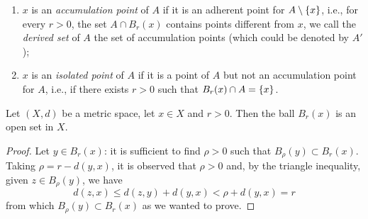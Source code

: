 \begin{definition}
\begin{enumerate}
\item
$x$ is an \emph{accumulation point}%
%
 of $A$ if
it is an adherent point for $A \setminus {\left\{ x \right\}}$, i.e.,
for every $r>0$, the set $A \cap B_r(x)$ contains points different from $x$, we
call the \emph{derived set}%
 of $A$ the set of accumulation points (which could be denoted by $A'$);
\item
$x$ is an \emph{isolated point}%
 of $A$ if it is a point of $A$ but not an accumulation point for $A$, i.e., if there exists $r>0$ such that
$B_r(x) \cap A = {\left\{ x \right\}}$.
\end{enumerate}
\end{definition}

\begin{theorem}
Let $(X,d)$ be a metric space, let $x\in X$ and $r>0$. Then the ball $B_r(x)$ is
an open set in $X$.
\end{theorem}
%
\begin{proof}
Let $y\in B_r(x)$: it is sufficient to find $\rho>0$ such that $B_\rho(y)
\subset B_r(x)$. Taking $\rho = r-d(y,x)$, it is observed that $\rho >0 $ and,
by the triangle inequality,
given $z \in B_\rho(y)$, we have
\[
  d(z,x) \le d(z,y) + d(y,x) < \rho + d(y,x) = r
\]
from which $B_\rho(y)\subset B_r(x)$ as we wanted to prove.
\end{proof}